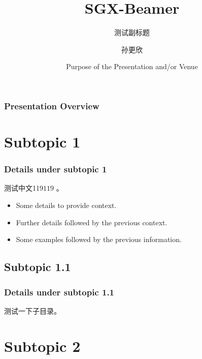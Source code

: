 \documentclass[hyperref={bookmarks=false},aspectratio=169, usenames,dvipsnames, hideothersubsections]{beamer}
\title[SGX-Beamer] %
{\bfseries{SGX-Beamer}} %
\subtitle{测试副标题} %
\author[孙更欣] %
{孙更欣\inst{1}}
\institute[SDU]  %
{
  \inst{1}
  计算机科学与技术学院\\ %
  山东大学
}
\date[\today] %
{Purpose of the Presentation and/or Venue} %
\begin{document}
\frame{\titlepage}  %

\begin{frame}
\frametitle{Presentation Overview}
\tableofcontents
\end{frame}


\section{Subtopic 1}
\begin{frame}
\frametitle{Details under subtopic 1}
测试中文119$119$ 。 %
\begin{itemize} %
    \item<1-> Some details to provide context. 
    \item<2-> Further details followed by the previous context.
    \item<3-> Some examples followed by the previous information.
\end{itemize}
\end{frame}

\subsection{Subtopic 1.1}
\begin{frame}
\frametitle{Details under subtopic 1.1}
测试一下子目录。
\end{frame}


%
%

\section{Subtopic 2}
\end{document}
